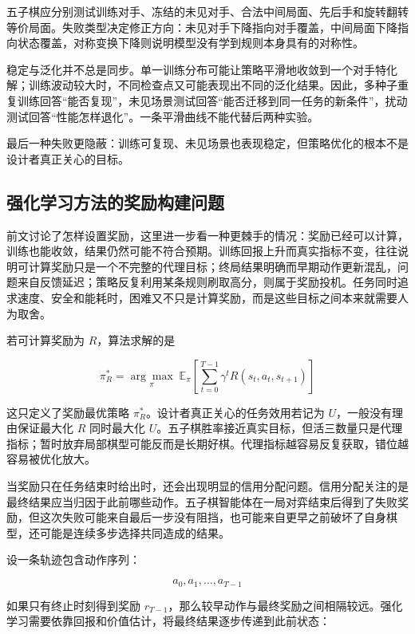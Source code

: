 五子棋应分别测试训练对手、冻结的未见对手、合法中间局面、先后手和旋转翻转等价局面。失败类型决定修正方向：未见对手下降指向对手覆盖，中间局面下降指向状态覆盖，对称变换下降则说明模型没有学到规则本身具有的对称性。

稳定与泛化并不总是同步。单一训练分布可能让策略平滑地收敛到一个对手特化解；训练波动较大时，不同检查点又可能表现出不同的泛化结果。因此，多种子重复训练回答“能否复现”，未见场景测试回答“能否迁移到同一任务的新条件”，扰动测试回答“性能怎样退化”。一条平滑曲线不能代替后两种实验。

最后一种失败更隐蔽：训练可复现、未见场景也表现稳定，但策略优化的根本不是设计者真正关心的目标。

\subsection{强化学习方法的奖励构建问题}

前文讨论了怎样设置奖励，这里进一步看一种更棘手的情况：奖励已经可以计算，训练也能收敛，结果仍然可能不符合预期。训练回报上升而真实指标不变，往往说明可计算奖励只是一个不完整的代理目标；终局结果明确而早期动作更新混乱，问题来自反馈延迟；策略反复利用某条规则刷取高分，则属于奖励投机。任务同时追求速度、安全和能耗时，困难又不只是计算奖励，而是这些目标之间本来就需要人为取舍。

若可计算奖励为 $R$，算法求解的是

\begin{equation}
\pi_R^*
=
\underset{\pi}{\arg\max}
\;
\mathbb{E}_{\pi}
\left[
\sum_{t=0}^{T-1}
\gamma^t R(s_t,a_t,s_{t+1})
\right]
\end{equation}

这只定义了奖励最优策略 $\pi_R^*$。设计者真正关心的任务效用若记为 $U$，一般没有理由保证最大化 $R$ 同时最大化 $U$。五子棋胜率接近真实目标，但活三数量只是代理指标；暂时放弃局部棋型可能反而是长期好棋。代理指标越容易反复获取，错位越容易被优化放大。


当奖励只在任务结束时给出时，还会出现明显的信用分配问题。信用分配关注的是最终结果应当归因于此前哪些动作。五子棋智能体在一局对弈结束后得到了失败奖励，但这次失败可能来自最后一步没有阻挡，也可能来自更早之前破坏了自身棋型，还可能是连续多步选择共同造成的结果。

设一条轨迹包含动作序列：

\begin{equation}
a_0,a_1,\ldots,a_{T-1}
\end{equation}

如果只有终止时刻得到奖励 $r_{T-1}$，那么较早动作与最终奖励之间相隔较远。强化学习需要依靠回报和价值估计，将最终结果逐步传递到此前状态：

